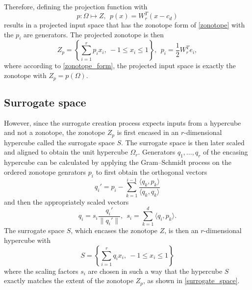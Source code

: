 \documentclass[
  a4paper,  %
  twoside,  %
  bibliography=totoc,
  headsepline,
  cleardoublepage=empty,
  parskip=half,
  draft=false
]{scrbook}
\begin{document}
Therefore, defining the projection function with
\begin{equation}
p \colon \Omega \mapsto Z, ~~ p(x)=W_r^T (x-c_d)
\nonumber
\end{equation}
results in a projected input space that has the zonotope form of \cref{zonotope} with the $p_i$ are generators.
The projected zonotope is then
\begin{equation}
Z_{p}=\left\{\sum_{i=1}^r p_i x_i , ~ -1 \leq x_i \leq 1\right\}, ~~ p_i=\frac{1}{2} W_r^T e_i,
\nonumber
\end{equation}
where according to \cref{zonotope_form}, the projected input space is exactly the zonotope with $Z_{p}=p(\Omega)$.

\subsection{Surrogate space}

However, since the surrogate creation process expects inputs from a hypercube and not a zonotope, the zonotope $Z_p$ is first encased in an $r$-dimensional hypercube called the surrogate space $S$.
The surrogate space is then later scaled and aligned to obtain the unit hypercube $\Omega_r$.
Generators $q_1, \dots, q_r$ of the encasing hypercube can be calculated by applying the Gram–Schmidt process on the ordered zonotope genrators $p_i$ to first obtain the orthogonal vectors
\begin{equation}
q_i'=p_i - \sum_{k=1}^{i-1} \frac{\langle q_k, p_k\rangle}{\langle q_k, q_k\rangle}
\label{q}
\end{equation}
and then the appropriately scaled vectors
\begin{equation}
q_i=s_i \frac{q_i'}{\| q_i' \|},~~ s_i=\sum_{k=1}^d \langle q_i, p_k\rangle.
\label{q_scaled}
\end{equation}
The surrogate space $S$, which encases the zonotope $Z$, is then an $r$-dimensional hypercube with
\begin{equation}
S=\left\{\sum_{i=1}^r q_i x_i, ~ -1 \leq x_i \leq 1\right\}
\label{surrogate_space}
\end{equation}
where the scaling factors $s_i$ are chosen in such a way that the hypercube $S$ exactly matches the extent of the zonotope $Z_p$, as shown in \cref{surrogate_space}.
\end{document}

